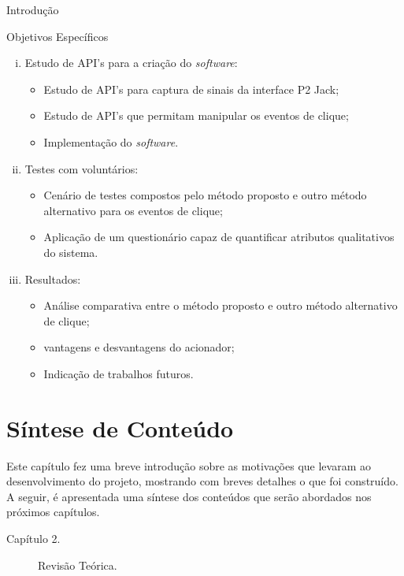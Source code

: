 \begin{chapter}{Introdução}
\begin{subsection}{Objetivos Específicos}
\begin{enumerate}[i)]
	\item Estudo de API's para a criação do \textit{software}: \vspace{-.2cm}
	\begin{itemize}
		\item Estudo de API's para captura de sinais da interface P2 Jack;
		\item Estudo de API's que permitam manipular os eventos de clique;
		\item Implementação do \textit{software}.
	\end{itemize}

	\item Testes com voluntários: \vspace{-.2cm}
	\begin{itemize}
		\item Cenário de testes compostos pelo método proposto e outro método alternativo para os eventos de clique;
		\item Aplicação de um questionário capaz de quantificar atributos qualitativos do sistema.
	\end{itemize}

	\item Resultados: \vspace{-.1cm}
	\begin{itemize}
		\item Análise comparativa entre o método proposto e outro método alternativo de clique;
		\item vantagens e desvantagens do acionador;
		\item Indicação de trabalhos futuros.
	\end{itemize}

\end{enumerate}

\end{subsection}

\section{Síntese de Conteúdo}

Este capítulo fez uma breve introdução sobre as motivações que levaram ao
desenvolvimento do projeto, mostrando com breves detalhes o que foi construído.
A seguir, é apresentada uma síntese dos conteúdos que serão abordados nos
próximos capítulos.

\begin{description}
	\item[Capítulo 2.] Revisão Teórica. 


\end{description}
\end{chapter}
